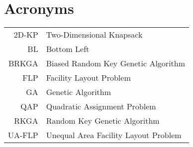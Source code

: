 \documentclass[english,master,unicode]{ctufit-thesis}
\theoremstyle{plain}
\theoremstyle{definition}
\theoremstyle{remark}
\numberwithin{theorem}{chapter}
\begin{document}
%
%
%
%
%
%
%
%
%



    \chapter{Acronyms}

    \begin{tabular}{rl}
        2D-KP  & Two-Dimensional Knapsack             \\
        BL     & Bottom Left                          \\
        BRKGA  & Biased Random Key Genetic Algorithm  \\
        FLP    & Facility Layout Problem              \\
        GA     & Genetic Algorithm                    \\
        QAP    & Quadratic Assignment Problem         \\
        RKGA   & Random Key Genetic Algorithm         \\
        UA-FLP & Unequal Area Facility Layout Problem
    \end{tabular}
\end{document}

